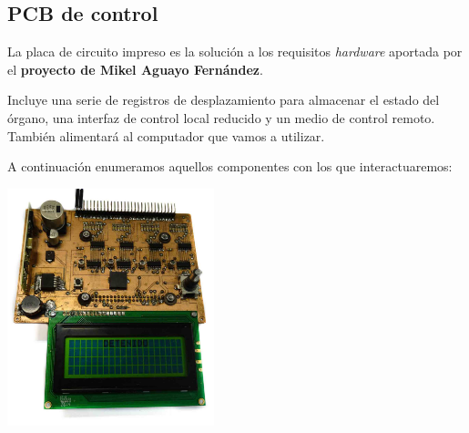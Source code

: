 \documentclass[10pt,a4paper]{article}
\begin{document}
	\subsection{PCB de control}
	
	\begin{multicols}{2}
		La placa de circuito impreso es la solución a los requisitos \textit{hardware} aportada por el \textbf{proyecto de Mikel Aguayo Fernández}. 
		
		Incluye una serie de registros de desplazamiento para almacenar el estado del órgano, una interfaz de control local reducido y un medio de control remoto. También alimentará al computador que vamos a utilizar. 
		
		A continuación enumeramos aquellos componentes con los que interactuaremos:
		\columnbreak		 
		\begin{center}
			\includegraphics[width=0.45\textwidth]{images/pcb} 
		\end{center}
	\end{multicols}	
	
\end{document}
